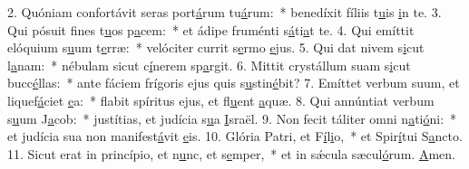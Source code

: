 2. Quóniam confortávit seras port\uline{á}rum tu\uline{á}rum:~* benedíxit fíliis t\uline{u}is \uline{i}n te.
3. Qui pósuit fines t\uline{u}os p\uline{a}cem:~* et ádipe fruménti s\uline{á}ti\uline{a}t te.
4. Qui emíttit elóquium s\uline{u}um t\uline{e}rræ:~* velóciter currit s\uline{e}rmo \uline{e}jus.
5. Qui dat nivem s\uline{i}cut l\uline{a}nam:~* nébulam sicut c\uline{í}nerem sp\uline{a}rgit.
6. Mittit crystállum suam s\uline{i}cut bucc\uline{é}llas:~* ante fáciem frígoris ejus quis s\uline{u}stin\uline{é}bit?
7. Emíttet verbum suum, et liquef\uline{á}ciet \uline{e}a:~* flabit spíritus ejus, et fl\uline{u}ent \uline{a}quæ.
8. Qui annúntiat verbum s\uline{u}um J\uline{a}cob:~* justítias, et judícia s\uline{u}a \uline{I}sraël.
9. Non fecit táliter omni n\uline{a}ti\uline{ó}ni:~* et judícia sua non manifest\uline{á}vit \uline{e}is.
10. Glória Patri, et F\uline{í}l\uline{i}o,~* et Spir\uline{í}tui S\uline{a}ncto.
11. Sicut erat in princípio, et n\uline{u}nc, et s\uline{e}mper,~* et in sǽcula sæcul\uline{ó}rum. \uline{A}men.
